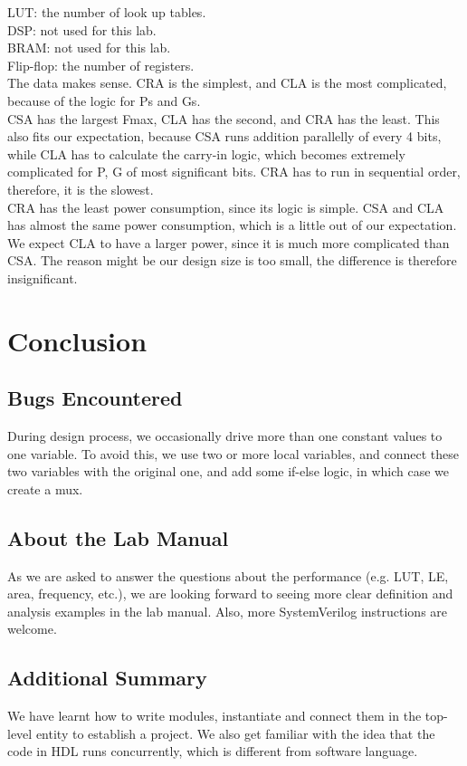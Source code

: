 \documentclass[12pt]{article}
\begin{document}
LUT: the number of look up tables. \\
DSP: not used for this lab. \\
BRAM: not used for this lab. \\
Flip-flop: the number of registers. \\

The data makes sense. CRA is the simplest, and CLA is the most complicated, because of the logic for Ps and Gs. \\
CSA has the largest Fmax, CLA has the second, and CRA has the least. This also fits our expectation, because CSA runs addition parallelly of every 4 bits, while CLA has to calculate the carry-in logic, which becomes extremely complicated for P, G of most significant bits. CRA has to run in sequential order, therefore, it is the slowest. \\
CRA has the least power consumption, since its logic is simple. CSA and CLA has almost the same power consumption, which is a little out of our expectation. We expect CLA to have a larger power, since it is much more complicated than CSA. The reason might be our design size is too small, the difference is therefore insignificant. 


\section{Conclusion}
\subsection{Bugs Encountered}
During design process, we occasionally drive more than one constant values to one variable. To avoid this, we use two or more local variables, and connect these two variables with the original one, and add some if-else logic, in which case we create a mux.

\subsection{About the Lab Manual}
As we are asked to answer the questions about the performance (e.g. LUT, LE, area, frequency, etc.), we are looking forward to seeing more clear definition and analysis examples in the lab manual. Also, more SystemVerilog instructions are welcome.

\subsection{Additional Summary}
We have learnt how to write modules, instantiate and connect them in the top-level entity to establish a project. We also get familiar with the idea that the code in HDL runs concurrently, which is different from software language. 

\newpage


\end{document}
